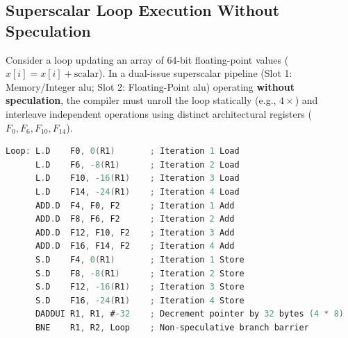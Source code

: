 \subsection{Superscalar Loop Execution Without Speculation}
\label{subsec:unrolling_without_speculation}

Consider a loop updating an array of 64-bit floating-point values ($x[i] = x[i] + \text{scalar}$). In a dual-issue superscalar pipeline (Slot 1: Memory/Integer \gls{alu}; Slot 2: Floating-Point \gls{alu}) operating \textbf{without speculation}, the compiler must unroll the loop statically (e.g., $4\times$) and interleave independent operations using distinct architectural registers ($F_0, F_6, F_{10}, F_{14}$).

\begin{lstlisting}[language=C, caption={$4\times$ Unrolled Loop without Speculation}]
Loop: L.D    F0, 0(R1)       ; Iteration 1 Load
      L.D    F6, -8(R1)      ; Iteration 2 Load
      L.D    F10, -16(R1)    ; Iteration 3 Load
      L.D    F14, -24(R1)    ; Iteration 4 Load
      ADD.D  F4, F0, F2      ; Iteration 1 Add
      ADD.D  F8, F6, F2      ; Iteration 2 Add
      ADD.D  F12, F10, F2    ; Iteration 3 Add
      ADD.D  F16, F14, F2    ; Iteration 4 Add
      S.D    F4, 0(R1)       ; Iteration 1 Store
      S.D    F8, -8(R1)      ; Iteration 2 Store
      S.D    F12, -16(R1)    ; Iteration 3 Store
      S.D    F16, -24(R1)    ; Iteration 4 Store
      DADDUI R1, R1, #-32    ; Decrement pointer by 32 bytes (4 * 8)
      BNE    R1, R2, Loop    ; Non-speculative branch barrier
\end{lstlisting}

